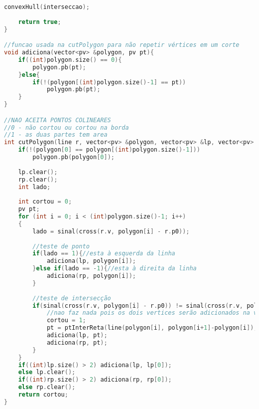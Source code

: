 \documentclass[12pt,a4paper, twoside]{report}
\begin{document}
\begin{lstlisting}[caption=Funções de polígono,language=C++]
    convexHull(interseccao);
    
    return true;
}

//funcao usada na cutPolygon para não repetir vértices em um corte
void adiciona(vector<pv> &polygon, pv pt){
    if((int)polygon.size() == 0){
        polygon.pb(pt);
    }else{
        if(!(polygon[(int)polygon.size()-1] == pt))
            polygon.pb(pt);
    }
}

//NAO ACEITA PONTOS COLINEARES
//0 - não cortou ou cortou na borda
//1 - as duas partes tem area
int cutPolygon(line r, vector<pv> &polygon, vector<pv> &lp, vector<pv> &rp){
    if(!(polygon[0] == polygon[(int)polygon.size()-1])) 
        polygon.pb(polygon[0]);
    
    lp.clear();
    rp.clear();
    int lado;
    
    int cortou = 0;
    pv pt;
    for (int i = 0; i < (int)polygon.size()-1; i++)
    {
        lado = sinal(cross(r.v, polygon[i] - r.p0));
        
        //teste de ponto
        if(lado == 1){//esta à esquerda da linha
            adiciona(lp, polygon[i]);
        }else if(lado == -1){//esta à direita da linha
            adiciona(rp, polygon[i]);
        }
        
        //teste de intersecção
        if(sinal(cross(r.v, polygon[i] - r.p0)) != sinal(cross(r.v, polygon[i+1] - r.p0))){//segmento está inteiro na reta (cortou na borda)
            //nao faz nada pois os dois vertices serão adicionados na verificacao acima
            cortou = 1;
            pt = ptInterReta(line(polygon[i], polygon[i+1]-polygon[i]), r);
            adiciona(lp, pt);
            adiciona(rp, pt);
        }
    }
    if((int)lp.size() > 2) adiciona(lp, lp[0]);
    else lp.clear();
    if((int)rp.size() > 2) adiciona(rp, rp[0]);
    else rp.clear();
    return cortou;
}
\end{lstlisting}
\end{document}
